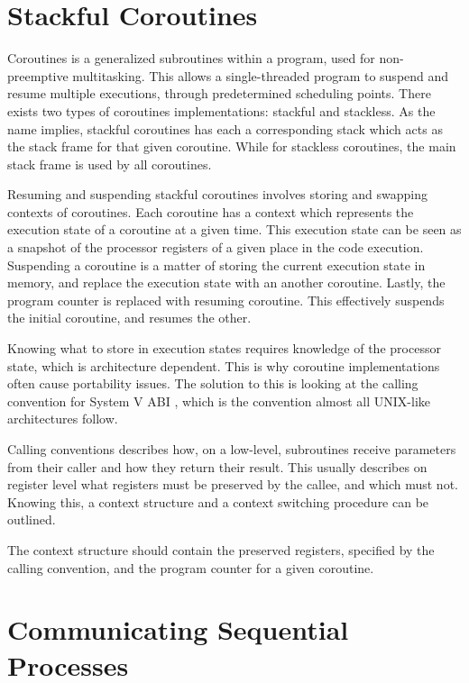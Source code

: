 \FloatBarrier

\section{Stackful Coroutines}
\label{sec:stackful_coroutines}

Coroutines is a generalized subroutines within a program, used for non-preemptive multitasking. This allows a single\hyp{}threaded program to suspend and resume multiple executions, through predetermined scheduling points. There exists two types of coroutines implementations: stackful and stackless. As the name implies, stackful coroutines has each a corresponding stack which acts as the stack frame for that given coroutine. While for stackless coroutines, the main stack frame is used by all coroutines.

Resuming and suspending stackful coroutines involves storing and swapping contexts of coroutines. Each coroutine has a context which represents the execution state of a coroutine at a given time. This execution state can be seen as a snapshot of the processor registers of a given place in the code execution. Suspending a coroutine is a matter of storing the current execution state in memory, and replace the execution state with an another coroutine. Lastly, the program counter is replaced with resuming coroutine. This effectively suspends the initial coroutine, and resumes the other. 

Knowing what to store in execution states requires knowledge of the processor state, which is architecture dependent. This is why coroutine implementations often cause portability issues. The solution to this is looking at the calling convention for System V ABI \citep{systemvabi}, which is the convention almost all UNIX\hyp{}like architectures follow. 

Calling conventions describes how, on a low\hyp{}level, subroutines receive parameters from their caller and how they return their result. This usually describes on register level what registers must be preserved by the callee, and which must not. Knowing this, a context structure and a context switching procedure can be outlined. 

The context structure should contain the preserved registers, specified by the calling convention, and the program counter for a given coroutine. 


\section{Communicating Sequential Processes}
\label{sec:csp}


